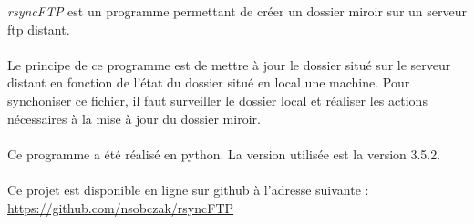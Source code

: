 \textit{rsyncFTP} est un programme permettant de créer un dossier miroir sur un serveur ftp distant.\\
\\
Le principe de ce programme est de mettre à jour le dossier situé sur le serveur distant en fonction de l'état du dossier 
situé en local une machine. Pour synchoniser ce fichier, il faut surveiller le dossier local et 
réaliser les actions nécessaires à la mise à jour du dossier miroir.\\
\\
Ce programme a été réalisé en python. La version utilisée est la version 3.5.2.\\
\\
Ce projet est disponible en ligne sur github à l'adresse suivante : \url{https://github.com/nsobczak/rsyncFTP}\\
